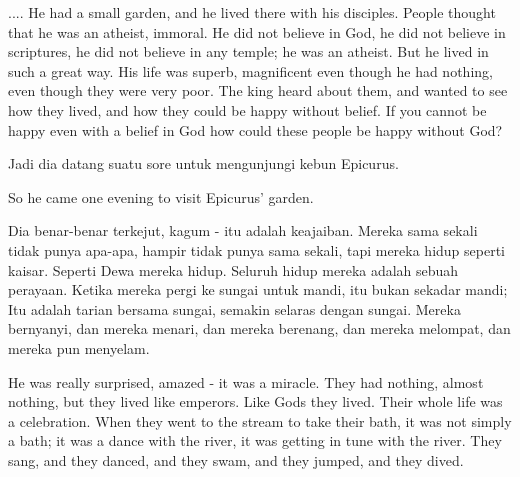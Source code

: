 \english
.... He had a small garden, and he lived there with his disciples. People thought that he was an atheist, immoral. He did not believe in God, he did not believe in scriptures, he did not believe in any temple; he was an atheist. But he lived in such a great way. His life was superb, magnificent even though he had nothing, even though they were very poor. The king heard about them, and wanted to see how they lived, and how they could be happy without belief. If you cannot be happy even with
a belief in God how could these people be happy without God?

\bahasa
Jadi dia datang suatu sore untuk mengunjungi kebun Epicurus.

\english
So he came one evening to visit Epicurus' garden.

\bahasa
Dia benar-benar terkejut, kagum - itu adalah keajaiban. Mereka sama sekali tidak punya apa-apa, hampir tidak punya sama sekali, tapi mereka hidup seperti kaisar. Seperti Dewa mereka hidup. Seluruh hidup mereka adalah sebuah perayaan. Ketika mereka pergi ke sungai untuk mandi, itu bukan sekadar mandi; Itu adalah tarian bersama sungai, semakin selaras dengan sungai. Mereka bernyanyi, dan mereka menari, dan mereka berenang, dan mereka melompat, dan mereka pun menyelam.

\english
He was really surprised, amazed - it was a miracle. They had nothing, almost nothing, but they lived like emperors. Like Gods they lived. Their whole life was a celebration. When they went to the stream to take their bath, it was not simply a bath; it was a dance with the river, it was getting in tune with the river. They sang, and they danced, and they swam, and they jumped, and they dived.
